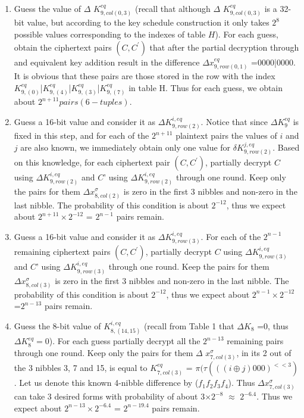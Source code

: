 \documentclass{transcrypto}
\begin{document}
\begin{enumerate}
	\item Guess the value of $\Delta$ $K_{9,col(0,3)} ^{eq}$ (recall that although $\Delta$ $K_{9,col(0,3)} ^{eq}$ is a 32-bit value, but according to the key schedule construction it only takes $2^8$ possible values corresponding to the indexes of table $H$). For each guess, obtain the ciphertext pairs $(C,C^{'})$ that after the partial decryption through  and equivalent key addition result in the difference $\Delta x_{9,row(0,1)} ^{eq}$ =0000|0000. It is obvious that these pairs are those stored in the row with the index $K_{9,(0)}^{eq}$|$K_{9,(4)}^{eq}$|$K_{9,(3)}^{eq}$|$K_{9,(7)}^{eq}$ in table H. Thus for each guess, we obtain about $2^{n+11} pairs (6-tuples)$. 
	\item Guess a 16-bit value and consider it as $\Delta K_{9,row(2)}^{i,eq}$. Notice that since $\Delta K_9^{eq}$ is fixed in this step, and for each of the $2^{n+11}$ plaintext pairs the values of $i$ and $j$ are also known, we immediately obtain only one value for $\delta K_{9,row(2)}^{j,eq}$. Based on this knowledge, for each ciphertext pair $(C,C^{'})$, partially decrypt $C$ using $\Delta K_{9,row(2)}^{i,eq}$ and $C’$ using $\Delta K_{9,row(2)}^{i,eq}$ through one round. Keep only the pairs for them $\Delta x_{8,col(2)}^{\sigma}$ is zero in the first 3 nibbles and non-zero in the last nibble. The probability of this condition is about $2^{-12}$, thus we expect about $2^{n+11}\times2^{-12}$ = $2^{n-1}$ pairs remain. 
	\item Guess a 16-bit value and consider it as $\Delta K_{9,row(3)}^{i,eq}$. For each of the $2^{n-1}$ remaining ciphertext pairs $(C,C^{'})$, partially decrypt $C$ using $\Delta K_{9,row(3)}^{i,eq}$ and $C’$ using $\Delta K_{9,row(3)}^{i,eq}$ through one round. Keep the pairs for them $\Delta x_{8,col(3)}^{\sigma}$ is zero in the first 3 nibbles and non-zero in the last nibble. The probability of this condition is about $2^{-12}$, thus we expect about $2^{n-1}\times 2^{-12}$ =$2^{n-13}$ pairs remain. 
	\item Guess the 8-bit value of $K_{8,(14,15)}^{i,eq}$ (recall from Table 1 that $\Delta K_8$ =0, thus $\Delta K_8^{eq} =0$). For each guess partially decrypt all the $2^{n-13}$ remaining pairs through one round. Keep only the pairs for them $\Delta$ $x_{7,col(3)}^{\sigma}$, in its 2 out of the 3 nibbles 3, 7 and 15, is equal to $K_{7,col(3)}^{eq}$ = $\pi(\tau(((i \oplus j)000)^{<<3})$. Let us denote this known 4-nibble difference by ($ f_1 f_2 f_3 f_4$). Thus $\Delta x_{7,col(3)}^{\sigma}$ can take 3 desired forms with probability of about 3$\times$$2^{-8}$ $\approx$ $2^{-6.4}$. Thus we expect about $2^{n-13}\times2^{-6.4}$ = $2^{n-19.4}$ pairs remain. 
$$
\end{enumerate}
\end{document}

